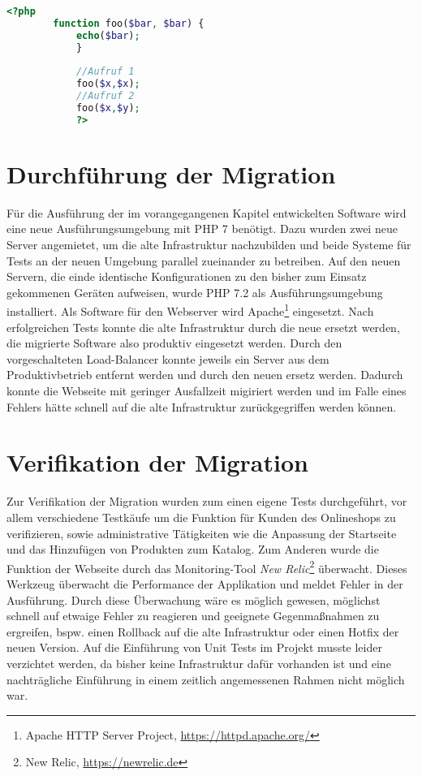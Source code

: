     \begin{lstlisting}[language=php, caption={Beispiel der Nutzung von preg\_replace\_callback}, label={lst:php7double}]
        <?php
        function foo($bar, $bar) {
            echo($bar);
            }
            
            //Aufruf 1
            foo($x,$x);
            //Aufruf 2
            foo($x,$y);
            ?>
        \end{lstlisting}
                
\section{Durchführung der Migration}
Für die Ausführung der im vorangegangenen Kapitel entwickelten Software wird eine neue Ausführungsumgebung mit \ac{PHP} 7 benötigt. Dazu wurden zwei neue 
Server angemietet, um die alte Infrastruktur nachzubilden und beide Systeme für Tests an der neuen Umgebung parallel zueinander zu betreiben. Auf den neuen 
Servern, die einde identische Konfigurationen zu den bisher zum Einsatz gekommenen Geräten aufweisen, wurde \ac{PHP} 7.2 als Ausführungsumgebung installiert. 
Als Software für den Webserver wird Apache\footnote{Apache HTTP Server Project, \url{https://httpd.apache.org/}} eingesetzt. Nach erfolgreichen Tests konnte die 
alte Infrastruktur durch die neue ersetzt werden, die migrierte Software also produktiv eingesetzt werden. Durch den vorgeschalteten Load-Balancer konnte jeweils 
ein Server aus dem Produktivbetrieb entfernt werden und durch den neuen ersetz werden. Dadurch konnte die Webseite mit geringer Ausfallzeit migiriert werden und 
im Falle eines Fehlers hätte schnell auf die alte Infrastruktur zurückgegriffen werden können.

\section{Verifikation der Migration}\label{newrelic}
Zur Verifikation der Migration wurden zum einen eigene Tests durchgeführt, vor allem verschiedene Testkäufe um die Funktion für Kunden des Onlineshops zu verifizieren, 
sowie administrative Tätigkeiten wie die Anpassung der Startseite und das Hinzufügen von Produkten zum Katalog. Zum Anderen wurde die Funktion der Webseite durch das 
Monitoring-Tool \textit{New Relic}\footnote{New Relic, \url{https://newrelic.de}} überwacht. Dieses Werkzeug überwacht die Performance der Applikation und meldet Fehler 
in der Ausführung. Durch diese Überwachung wäre es möglich gewesen, möglichst schnell auf etwaige Fehler zu reagieren und geeignete 
Gegenmaßnahmen zu ergreifen, bspw. einen Rollback auf die alte Infrastruktur oder einen Hotfix der neuen Version. 
Auf die Einführung von Unit Tests im Projekt musste leider verzichtet werden, da bisher keine Infrastruktur dafür vorhanden ist 
und eine nachträgliche Einführung in einem zeitlich angemessenen Rahmen nicht möglich war.

